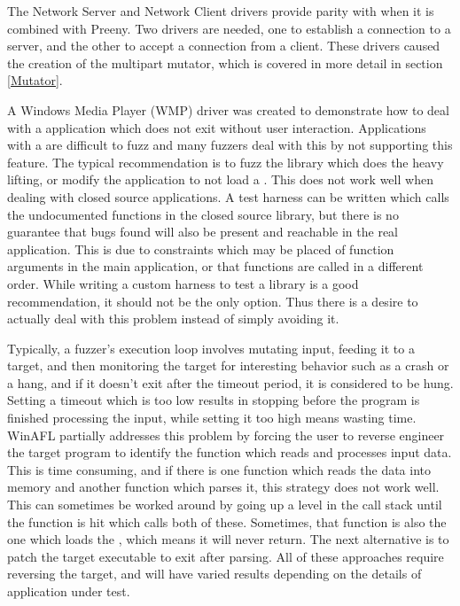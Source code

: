 The Network Server and Network Client drivers provide parity with \AFL{} when it
is combined with Preeny.  Two drivers are needed, one to establish
a connection to a server, and the other to accept a connection from a
client. These drivers caused the creation of the multipart mutator,
which is covered in more detail in section \ref{Mutator}.

A Windows Media Player (WMP) driver was created to demonstrate how to deal with
a \GUI{} application which does not exit without user interaction. Applications
with a \GUI{} are difficult to fuzz and many fuzzers deal with this by not
supporting this feature.  The typical recommendation is to fuzz the library
which does the heavy lifting, or modify the application to not load a \GUI{}.
This does not work well when dealing with closed source applications. A test
harness can be written which calls the undocumented functions in the closed
source library, but there is no guarantee that bugs found will also be present
and reachable in the real application.  This is due to constraints which may
be placed of function arguments in the main application, or that functions are
called in a different order.  While writing a custom harness to test a library
is a good recommendation, it should not be the only option. Thus there is a
desire to actually deal with this problem instead of simply avoiding it.

Typically, a fuzzer's execution loop involves mutating input, feeding it to a
target, and then monitoring the target for interesting behavior such as a crash
or a hang, and if it doesn't exit after the timeout period, it is considered to
be hung. Setting a timeout which is too low results in stopping before the
program is finished processing the input, while setting it too high means
wasting time. WinAFL partially addresses this problem by forcing the user to
reverse engineer the target program to identify the function which reads and
processes input data.  This is time consuming, and if there is one function
which reads the data into memory and another function which parses it, this
strategy does not work well. This can sometimes be worked around by going up
a level in the call stack until the function is hit which calls both of these.
Sometimes, that function is also the one which loads the \GUI{}, which means
it will never return. The next alternative is to patch the target executable
to exit after parsing. All of these approaches require reversing the target,
and will have varied results depending on the details of application under test.


